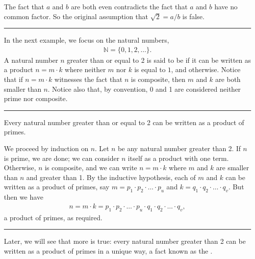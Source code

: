 \documentclass[letterpaper,10pt,english]{sphinxmanual}
\begin{document}
\sphinxAtStartPar
The fact that \(a\) and \(b\) are both even contradicts the fact that \(a\) and \(b\) have no common factor. So the original assumption that \(\sqrt 2 = a / b\) is false.


\bigskip\hrule\bigskip


\sphinxAtStartPar
In the next example, we focus on the natural numbers,
\begin{equation*}
\begin{split}\mathbb{N} = \{ 0, 1, 2, \ldots \}.\end{split}
\end{equation*}
\sphinxAtStartPar
A natural number \(n\) greater than or equal to 2 is said to be  if it can be written as a product \(n = m \cdot k\) where neither \(m\) nor \(k\) is equal to \(1\), and  otherwise. Notice that if \(n = m \cdot k\) witnesses the fact that \(n\) is composite, then \(m\) and \(k\) are both smaller than \(n\). Notice also that, by convention, 0 and 1 are considered neither prime nor composite.


\bigskip\hrule\bigskip


\sphinxAtStartPar
{} Every natural number greater than or equal to 2 can be written as a product of primes.

\sphinxAtStartPar
{} We proceed by induction on \(n\). Let \(n\) be any natural number greater than 2. If \(n\) is prime, we are done; we can consider \(n\) itself as a product with one term. Otherwise, \(n\) is composite, and we can write \(n = m \cdot k\) where \(m\) and \(k\) are smaller than \(n\) and greater than 1. By the inductive hypothesis, each of \(m\) and \(k\) can be written as a product of primes, say
\(m = p_1 \cdot p_2 \cdot \ldots \cdot p_u\) and \(k = q_1 \cdot q_2 \cdot \ldots \cdot q_v\). But then we have
\begin{equation*}
\begin{split}n = m \cdot k = p_1 \cdot p_2 \cdot \ldots \cdot p_u \cdot q_1 \cdot
q_2 \cdot \ldots \cdot q_v,\end{split}
\end{equation*}
\sphinxAtStartPar
a product of primes, as required.


\bigskip\hrule\bigskip


\sphinxAtStartPar
Later, we will see that more is true: every natural number greater than 2 can be written as a product of primes in a unique way, a fact known as the .
\end{document}

